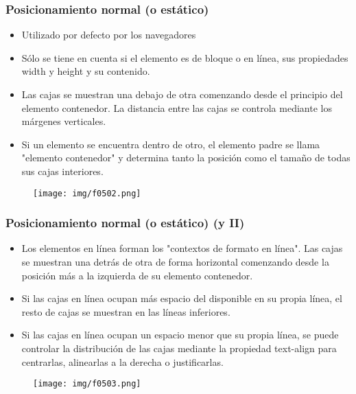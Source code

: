 
\begin{frame}
\frametitle{Posicionamiento normal (o estático)}

\begin{itemize}
  \item Utilizado por defecto por los navegadores
  \item Sólo se tiene en cuenta si el elemento es de bloque o en línea, sus propiedades width y height y su contenido.
  \item Las cajas se muestran una debajo de otra comenzando desde el principio del elemento contenedor. La distancia entre las cajas se controla mediante los márgenes verticales.
  \item Si un elemento se encuentra dentro de otro, el elemento padre se llama "elemento contenedor" y determina tanto la posición como el tamaño de todas sus cajas interiores.
\end{itemize}


\begin{center}
\begin{figure}[p]
\texttt{[image: img/f0502.png]}
\end{figure}
\end{center}

\end{frame}



\begin{frame}
\frametitle{Posicionamiento normal (o estático) (y II)}

\begin{itemize}
  \item Los elementos en línea forman los "contextos de formato en línea". Las cajas se muestran una detrás de otra de forma horizontal comenzando desde la posición más a la izquierda de su elemento contenedor.
  \item Si las cajas en línea ocupan más espacio del disponible en su propia línea, el resto de cajas se muestran en las líneas inferiores. 
  \item Si las cajas en línea ocupan un espacio menor que su propia línea, se puede controlar la distribución de las cajas mediante la propiedad text-align para centrarlas, alinearlas a la derecha o justificarlas.
\end{itemize}


\begin{center}
\begin{figure}[p]
\texttt{[image: img/f0503.png]}
\end{figure}
\end{center}

\end{frame}


